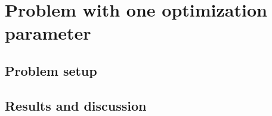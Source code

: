 \section{Problem with one optimization parameter}

\subsection{Problem setup}



\subsection{Results and discussion}